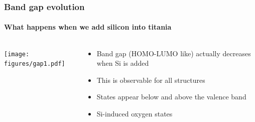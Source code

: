 \documentclass[noamsthm,8pt,t,xcolor={dvipsnames}]{beamer}
\begin{document}
\begin{frame}
   \frametitle{Band gap evolution}
   \framesubtitle{What happens when we add silicon into titania}

   \begin{columns}
      \begin{column}{0.5\textwidth}
         \begin{center}
            \texttt{[image: figures/gap1.pdf]}
         \end{center}
      \end{column}
      \begin{column}{0.5\textwidth}
         \begin{itemize}
            \item Band gap (HOMO-LUMO like) actually decreases when Si is added
            \item This is observable for all structures
            \item<2-> States appear below and above the valence band
            \item<3> Si-induced oxygen states
         \end{itemize}
         \begin{center}
         \end{center}
      \end{column}
   \end{columns}
\end{frame}
\end{document}

